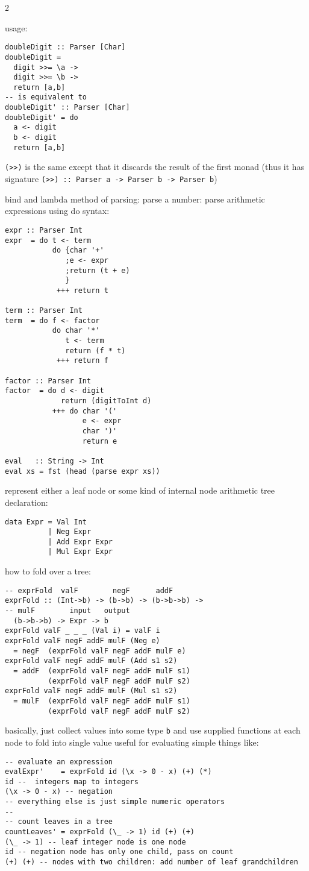 \documentclass{article}
\def \columncount {2}
\newcommand{\codesize}{8.5}
\newcommand{\haskell}[1]{{\fontsize{\codesize}{\codesize}\selectfont\texttt{#1}}}
\begin{document}
\begin{multicols*}{\columncount}
\begin{outline}[longenum]
  \2 usage:
\begin{verbatim}
doubleDigit :: Parser [Char]
doubleDigit =
  digit >>= \a ->
  digit >>= \b ->
  return [a,b]
-- is equivalent to
doubleDigit' :: Parser [Char]
doubleDigit' = do
  a <- digit
  b <- digit
  return [a,b]
\end{verbatim}
  \2 \haskell{(>>)} is the same except that it discards the result of the first monad (thus it has signature \haskell{(>>) :: Parser a -> Parser b -> Parser b})

  \1 bind and lambda method of parsing:
    \2 parse a number:
  \1 parse arithmetic expressions using do syntax:
\begin{verbatim}
expr :: Parser Int
expr  = do t <- term
           do {char '+'
              ;e <- expr
              ;return (t + e)
              }
            +++ return t

term :: Parser Int
term  = do f <- factor
           do char '*'
              t <- term
              return (f * t)
            +++ return f

factor :: Parser Int
factor  = do d <- digit
             return (digitToInt d)
           +++ do char '('
                  e <- expr
                  char ')'
                  return e

eval   :: String -> Int
eval xs = fst (head (parse expr xs))
\end{verbatim}

  \1 represent either a leaf node or some kind of internal node
  \1 arithmetic tree declaration:
\begin{verbatim}
data Expr = Val Int
          | Neg Expr 
          | Add Expr Expr 
          | Mul Expr Expr
\end{verbatim}
  \1 how to fold over a tree:
\begin{verbatim}
-- exprFold  valF        negF      addF     
exprFold :: (Int->b) -> (b->b) -> (b->b->b) ->
-- mulF        input   output
  (b->b->b) -> Expr -> b
exprFold valF _ _ _ (Val i) = valF i
exprFold valF negF addF mulF (Neg e) 
  = negF  (exprFold valF negF addF mulF e)
exprFold valF negF addF mulF (Add s1 s2) 
  = addF  (exprFold valF negF addF mulF s1)
          (exprFold valF negF addF mulF s2)
exprFold valF negF addF mulF (Mul s1 s2) 
  = mulF  (exprFold valF negF addF mulF s1) 
          (exprFold valF negF addF mulF s2)
\end{verbatim}
    \2 basically, just collect values into some type \haskell{b} and use supplied functions at each node to fold into single value
    \2 useful for evaluating simple things like:
\begin{verbatim}
-- evaluate an expression
evalExpr'    = exprFold id (\x -> 0 - x) (+) (*)
id --  integers map to integers
(\x -> 0 - x) -- negation
-- everything else is just simple numeric operators
-- 
-- count leaves in a tree
countLeaves' = exprFold (\_ -> 1) id (+) (+)
(\_ -> 1) -- leaf integer node is one node
id -- negation node has only one child, pass on count
(+) (+) -- nodes with two children: add number of leaf grandchildren
\end{verbatim}



\end{outline}
\end{multicols*}
\end{document}
